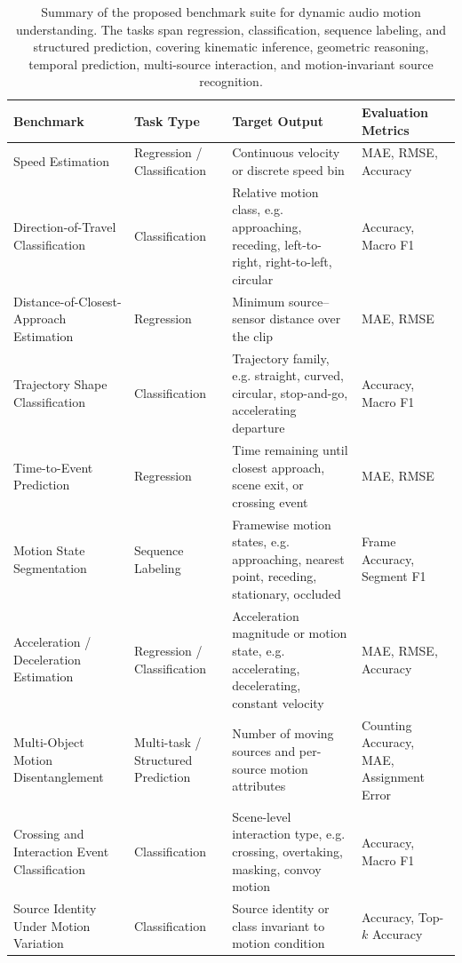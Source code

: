 \documentclass{article}
\begin{document}
\begin{table}[t]
\centering
\small
\begin{tabular}{p{3.0cm} p{2.6cm} p{4.4cm} p{3.2cm}}
\hline
\textbf{Benchmark} & \textbf{Task Type} & \textbf{Target Output} & \textbf{Evaluation Metrics} \\
\hline

Speed Estimation
& Regression / Classification
& Continuous velocity or discrete speed bin
& MAE, RMSE, Accuracy \\

Direction-of-Travel Classification
& Classification
& Relative motion class, e.g. approaching, receding, left-to-right, right-to-left, circular
& Accuracy, Macro F1 \\

Distance-of-Closest-Approach Estimation
& Regression
& Minimum source--sensor distance over the clip
& MAE, RMSE \\

Trajectory Shape Classification
& Classification
& Trajectory family, e.g. straight, curved, circular, stop-and-go, accelerating departure
& Accuracy, Macro F1 \\

Time-to-Event Prediction
& Regression
& Time remaining until closest approach, scene exit, or crossing event
& MAE, RMSE \\

Motion State Segmentation
& Sequence Labeling
& Framewise motion states, e.g. approaching, nearest point, receding, stationary, occluded
& Frame Accuracy, Segment F1 \\

Acceleration / Deceleration Estimation
& Regression / Classification
& Acceleration magnitude or motion state, e.g. accelerating, decelerating, constant velocity
& MAE, RMSE, Accuracy \\

Multi-Object Motion Disentanglement
& Multi-task / Structured Prediction
& Number of moving sources and per-source motion attributes
& Counting Accuracy, MAE, Assignment Error \\

Crossing and Interaction Event Classification
& Classification
& Scene-level interaction type, e.g. crossing, overtaking, masking, convoy motion
& Accuracy, Macro F1 \\

Source Identity Under Motion Variation
& Classification
& Source identity or class invariant to motion condition
& Accuracy, Top-\(k\) Accuracy \\

\hline
\end{tabular}
\caption{Summary of the proposed benchmark suite for dynamic audio motion understanding. The tasks span regression, classification, sequence labeling, and structured prediction, covering kinematic inference, geometric reasoning, temporal prediction, multi-source interaction, and motion-invariant source recognition.}
\label{tab:benchmark_suite}
\end{table}
\end{document}
